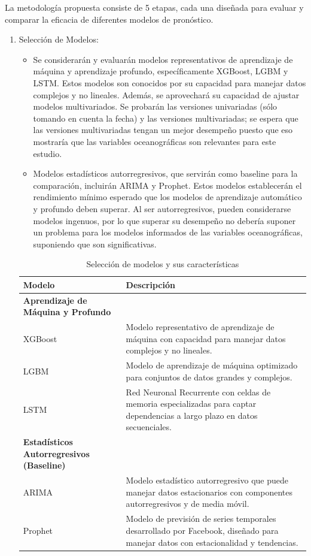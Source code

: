 La metodología propuesta consiste de 5 etapas, cada una diseñada para evaluar y comparar la eficacia de diferentes modelos de pronóstico.

\begin{enumerate}
\item Selección de Modelos:

\begin{itemize}
    \item Se considerarán y evaluarán modelos representativos de aprendizaje de máquina y aprendizaje profundo, específicamente XGBoost, LGBM y LSTM. Estos modelos son conocidos por su capacidad para manejar datos complejos y no lineales. Además, se aprovechará su capacidad de ajustar modelos multivariados. Se probarán las versiones univariadas (sólo tomando en cuenta la fecha) y las versiones multivariadas; se espera que las versiones multivariadas tengan un mejor desempeño puesto que eso mostraría que las variables oceanográficas son relevantes para este estudio.
    \item Modelos estadísticos autorregresivos, que servirán como baseline para la comparación, incluirán ARIMA y Prophet. Estos modelos establecerán el rendimiento mínimo esperado que los modelos de aprendizaje automático y profundo deben superar. Al ser autorregresivos, pueden considerarse modelos ingenuos, por lo que superar su desempeño no debería suponer un problema para los modelos informados de las variables oceanográficas, suponiendo que son significativas. 
\end{itemize}

\begin{table}[htbp]
  \centering
  \caption{Selección de modelos y sus características}
  \begin{tabular}{|p{4cm}|p{7.5cm}|}
    \hline
    \textbf{Modelo} & \textbf{Descripción} \\
    \hline
    \textbf{Aprendizaje de Máquina y Profundo} & \\
    \hline
    XGBoost & Modelo representativo de aprendizaje de máquina con capacidad para manejar datos complejos y no lineales. \\
    \hline
    LGBM & Modelo de aprendizaje de máquina optimizado para conjuntos de datos grandes y complejos. \\
    \hline
    LSTM & Red Neuronal Recurrente con celdas de memoria especializadas para captar dependencias a largo plazo en datos secuenciales. \\
    \hline
    \textbf{Estadísticos Autorregresivos (Baseline)} & \\
    \hline
    ARIMA & Modelo estadístico autorregresivo que puede manejar datos estacionarios con componentes autorregresivos y de media móvil. \\
    \hline
    Prophet & Modelo de previsión de series temporales desarrollado por Facebook, diseñado para manejar datos con estacionalidad y tendencias. \\


\end{tabular}
\end{table}
\end{enumerate}
